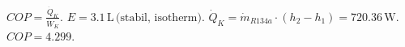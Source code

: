 \( COP = \frac{\dot{Q}_K}{\dot{W}_K} \).  
\( E = 3.1 \, \text{L} \, \text{(stabil, isotherm)} \).  
\( \dot{Q}_K = \dot{m}_{R134a} \cdot (h_2 - h_1) = 720.36 \, \text{W} \).  
\( COP = 4.299 \).
